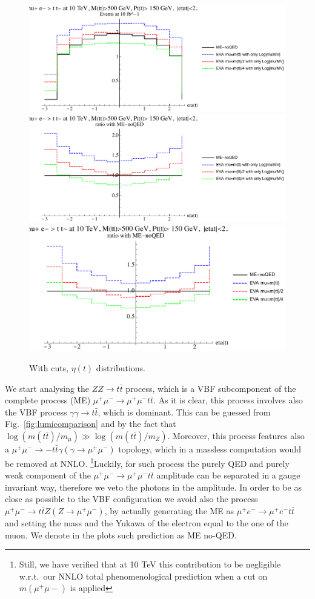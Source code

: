 \documentclass[a4paper,11pt]{article}
\begin{document}
\begin{figure}[!t]
\includegraphics[width=0.46\linewidth]{Notebooks/PlotDistr/ZZ_tt/10TeVcuts/plotetat.pdf}
\includegraphics[width=0.46\linewidth]{Notebooks/PlotDistr/ZZ_tt/10TeVcuts/plotetatratio1.pdf}
\includegraphics[width=0.46\linewidth]{Notebooks/PlotDistr/ZZ_tt/10TeVcuts/plotetatratio2.pdf}
\caption{With cuts, $\eta(t)$ distributions. \label{fig:cutsZZtt2}}
\end{figure}



We start analysing the $ZZ\to t \bar t$ process, which is a VBF subcomponent of the complete process (ME) $\mu^+\mu^-\to\mu^+\mu^- t \bar t$. As it is clear, this process involves also the VBF process $\gamma \gamma \to t \bar t$, which is dominant. This can be guessed from Fig.~\ref{fig:lumicomparison} and by the fact that $\log(m(t\bar t)/m_\mu)\gg \log(m(t\bar t)/m_Z)$. Moreover, this process features also a $\mu^+\mu^-\to- t \bar t \gamma (\gamma \to\mu^+\mu^-)$ topology, which in a massless computation would be removed at NNLO. \footnote{Still, we have verified that at 10 TeV this contribution to be negligible w.r.t.~our NNLO total phenomenological prediction when a cut on $m(\mu^+ \mu-)$ is applied }Luckily, for such process the purely QED and purely weak component of the $\mu^+\mu^-\to\mu^+\mu^- t \bar t$ amplitude can be separated in a gauge invariant way, therefore we veto the photons in the amplitude. In order to be as close as possible to the VBF configuration we avoid also the process $\mu^+\mu^-\to t \bar t Z (Z \to\mu^+\mu^- )$, by actually generating the ME as $\mu^+e^-\to\mu^+e^- t \bar t$ and setting the mass and the Yukawa of the electron equal to the one of the muon. We denote in the plots such prediction as ME no-QED.
\end{document}
